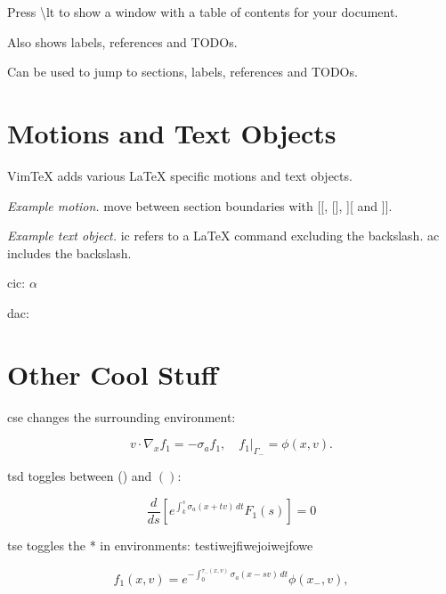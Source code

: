 \documentclass{article}
\newcommand{\lt}{\textbackslash{}lt }
\begin{document}
Press \lt to show a window with a table of contents for your document.

Also shows labels, references and TODOs. 

Can be used to jump to sections, labels, references and TODOs.











\section{Motions and Text Objects}

VimTeX adds various LaTeX specific motions and text objects.

\emph{Example motion.} move between section boundaries with [[, [], ][ and ]].

\emph{Example text object.} ic refers to a LaTeX command excluding the
backslash. ac includes the backslash.

cic: \( \alpha \)

dac: \(  \)











\section{Other Cool Stuff}

cse changes the surrounding environment:

\begin{equation}
  v \cdot \nabla_x f_1 = -\sigma_a f_1, \quad f_1 \rvert_{\Gamma_-} = \phi(x,v).
\end{equation}

tsd toggles between () and \( \left( \right) \):

\begin{equation*}
  \frac{d}{ds} \left[ e^{\int_k^s \sigma_a(x + tv)\,dt} F_1(s) \right] = 0
\end{equation*}

tse toggles the * in environments:
testiwejfiwejoiwejfowe

\begin{equation}
  f_1(x, v) = e^{-\int_0^{\tau_-(x, v)} \sigma_a(x - sv)\,dt} \phi(x_-, v),
\end{equation}
\end{document}
